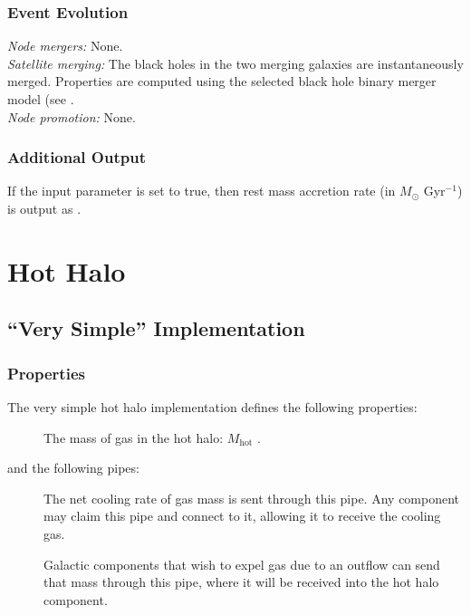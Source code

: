 \subsubsection{Event Evolution}

\noindent\emph{Node mergers:} None.\\

\noindent\emph{Satellite merging:} The black holes in the two merging galaxies are instantaneously merged. Properties are computed using the selected black hole binary merger model (see .\\

\noindent\emph{Node promotion:} None.\\

\subsubsection{Additional Output}

If the \mono{[blackHoleOutputAccretion]} input parameter is set to true, then rest mass accretion rate (in $M_\odot$ Gyr$^{-1}$) is output as .

\section{Hot Halo}

\subsection{``Very Simple'' Implementation}

\subsubsection{Properties}

The very simple hot halo implementation defines the following properties:
\begin{description}
 \item [] The mass of gas in the hot halo: $M_\mathrm{hot}$ \mono{[hotHaloMass]}.
\end{description}
and the following pipes:
\begin{description}
 \item [] The net cooling rate of gas mass is sent through this pipe. Any \gls{component} may claim this pipe and connect to it, allowing it to receive the cooling gas.
 \item [] Galactic components that wish to expel gas due to an outflow can send that mass  through this pipe, where it will be received into the hot halo component. 
\end{description}

